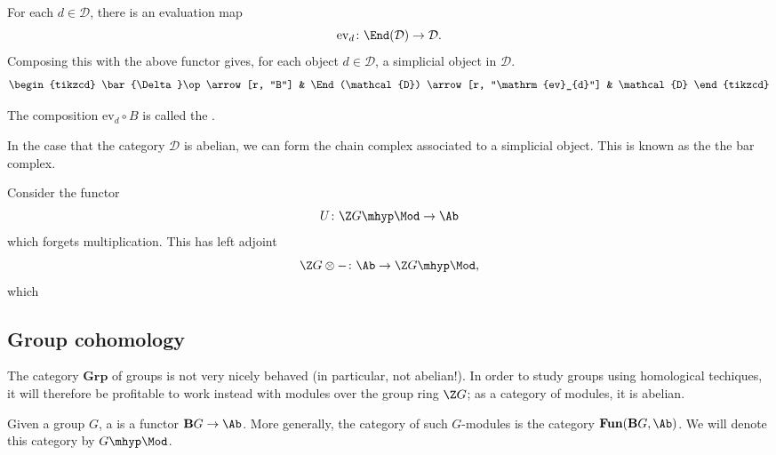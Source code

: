 \documentclass[main.tex]{subfiles}
\begin{document}
For each $d \in \mathcal{D}$, there is an evaluation map
\begin{equation*}
  \mathrm{ev}_{d}\colon \End(\mathcal{D}) \to \mathcal{D}.
\end{equation*}
Composing this with the above functor gives, for each object $d \in \mathcal{D}$, a simplicial object in $\mathcal{D}$.
\begin{equation*}
  \begin{tikzcd}
    \bar{\Delta}\op
    \arrow[r, "B"]
    & \End(\mathcal{D})
    \arrow[r, "\mathrm{ev}_{d}"]
    & \mathcal{D}
  \end{tikzcd}
\end{equation*}

\begin{definition}
  \label{def:bar_construction}
  The composition $\mathrm{ev}_{d} \circ B$ is called the .
\end{definition}

In the case that the category $\mathcal{D}$ is abelian, we can form the chain complex associated to a simplicial object. This is known as the the bar complex.

\begin{example}
  Consider the functor
  \begin{equation*}
    U\colon \Z G\mhyp\Mod \to \Ab
  \end{equation*}
  which forgets multiplication. This has left adjoint
  \begin{equation*}
    \Z G \otimes -\colon \Ab \to \Z G\mhyp\Mod,
  \end{equation*}
  which
\end{example}

\subsection{Group cohomology}
\label{ssc:group_cohomology}

The category $\mathbf{Grp}$ of groups is not very nicely behaved (in particular, not abelian!). In order to study groups using homological techiques, it will therefore be profitable to work instead with modules over the group ring $\Z G$; as a category of modules, it is abelian.

Given a group $G$, a  is a functor $\mathbf{B}G \to \Ab$. More generally, the category of such $G$-modules is the category $\mathbf{Fun}(\mathbf{B}G, \Ab)$. We will denote this category by $G\mhyp\Mod$.
\end{document}
